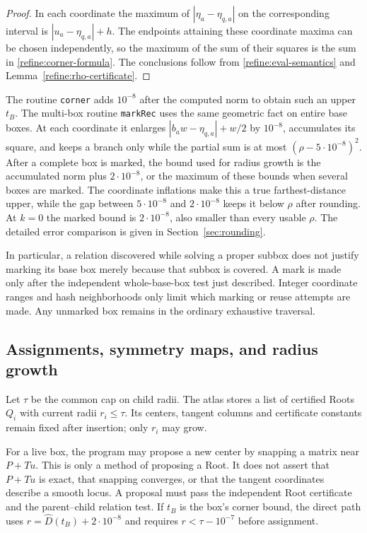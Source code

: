 \begin{proof}
In each coordinate the maximum of $|\eta_a-\eta_{q,a}|$ on the
corresponding interval is $|u_a-\eta_{q,a}|+h$.  The endpoints attaining
these coordinate maxima can be chosen independently, so the maximum of
the sum of their squares is the sum in \eqref{refine:corner-formula}.
The conclusions follow from \eqref{refine:eval-semantics} and
Lemma~\ref{refine:rho-certificate}.
\end{proof}

The routine \texttt{corner} adds $10^{-8}$ after the computed norm to
obtain such an upper $t_B$.  The multi-box routine \texttt{markRec}
uses the same geometric fact on entire base boxes.  At each coordinate
it enlarges $|b_aw-\eta_{q,a}|+w/2$ by $10^{-8}$, accumulates its
square, and keeps a branch only while the partial sum is at most
$(\rho-5\cdot10^{-8})^2$.  After a complete box is marked, the bound
used for radius growth is the accumulated norm plus $2\cdot10^{-8}$,
or the maximum of these bounds when several boxes are marked.  The
coordinate inflations make this a true farthest-distance upper, while
the gap between $5\cdot10^{-8}$ and $2\cdot10^{-8}$ keeps it below
$\rho$ after rounding.  At $k=0$ the marked bound is $2\cdot10^{-8}$,
also smaller than every usable $\rho$.  The detailed error comparison
is given in Section~\ref{sec:rounding}.

In particular, a relation discovered while solving a proper subbox
does not justify marking its base box merely because that subbox is
covered.  A mark is made only after the independent whole-base-box
test just described.  Integer coordinate ranges and hash neighborhoods
only limit which marking or reuse attempts are made.  Any unmarked
box remains in the ordinary exhaustive traversal.

\subsection{Assignments, symmetry maps, and radius growth}

Let $\tau$ be the common cap on child radii.  The atlas stores a list
of certified Roots $Q_i$ with current radii $r_i\leq\tau$.  Its centers,
tangent columns and certificate constants remain fixed after insertion;
only $r_i$ may grow.

For a live box, the program may propose a new center by snapping a
matrix near $P+Tu$.  This is only a method of proposing a Root.  It
does not assert that $P+Tu$ is exact, that snapping converges, or that
the tangent coordinates describe a smooth locus.  A proposal must pass
the independent Root certificate and the parent--child relation test.
If $t_B$ is the box's corner bound, the direct path uses
$r=\widehat D(t_B)+2\cdot10^{-8}$ and requires
$r<\tau-10^{-7}$ before assignment.

